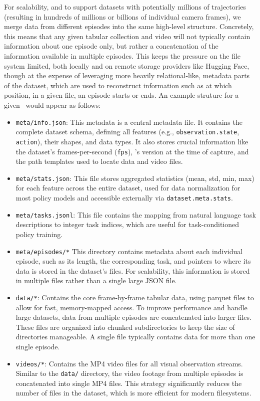 For scalability, and to support datasets with potentially millions of trajectories (resulting in hundreds of millions or billions of individual camera frames), we merge data from different episodes into the same high-level structure.
Concretely, this means that any given tabular collection and video will not typically contain information about one episode only, but rather a concatenation of the information available in multiple episodes.
This keeps the pressure on the file system limited, both locally and on remote storage providers like Hugging Face, though at the expense of leveraging more heavily relational-like, metadata parts of the dataset, which are used to reconstruct information such as at which position, in a given file, an episode starts or ends.
An example struture for a given \lerobotdataset~would appear as follows:
\begin{itemize}
\item \texttt{meta/info.json}: This metadata is a central metadata file. It contains the complete dataset schema, defining all features (e.g., \texttt{observation.state}, \texttt{action}), their shapes, and data types. It also stores crucial information like the dataset's frames-per-second (\texttt{fps}), \lerobot's version at the time of capture, and the path templates used to locate data and video files.
\item \texttt{meta/stats.json}: This file stores aggregated statistics (mean, std, min, max) for each feature across the entire dataset, used for data normalization for most policy models and accessible externally via \texttt{dataset.meta.stats}.
\item \texttt{meta/tasks.jsonl}: This file contains the mapping from natural language task descriptions to integer task indices, which are useful for task-conditioned policy training.
\item \texttt{meta/episodes/*} This directory contains metadata about each individual episode, such as its length, the corresponding task, and pointers to where its data is stored in the dataset's files. For scalability, this information is stored in multiple files rather than a single large JSON file.
\item \texttt{data/*}: Contains the core frame-by-frame tabular data, using parquet files to allow for fast, memory-mapped access. To improve performance and handle large datasets, data from multiple episodes are concatenated into larger files. These files are organized into chunked subdirectories to keep the size of directories manageable. A single file typically contains data for more than one single episode.
\item \texttt{videos/*}: Contains the MP4 video files for all visual observation streams. Similar to the \texttt{data/} directory, the video footage from multiple episodes is concatenated into single MP4 files. This strategy significantly reduces the number of files in the dataset, which is more efficient for modern filesystems.
\end{itemize}

